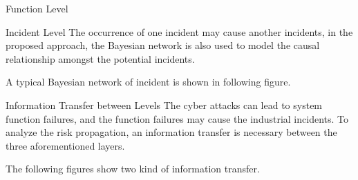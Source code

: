 \begin{frame}{Function Level}
    \label<trans:1>{Hazardous Incident Prediction: Comparison of Fault Tree and Bayesian Network Question}
    \label<trans:2>{Hazardous Incident Prediction: Comparison of Fault Tree and Bayesian Network Answer}
    \begin{overlayarea}{\textwidth}{6cm}
    \begin{center}
      
    \end{center}
    \end{overlayarea}
\end{frame}

\begin{frame}{Incident Level}\label{Hazardous Incident Prediction: Incident Level}
    The occurrence of one incident may cause another incidents, in the proposed approach, the Bayesian network is also used to model the causal relationship amongst the potential incidents.

    A typical Bayesian network of incident is shown in following figure.

    \begin{center}
      
    \end{center}
\end{frame}

\begin{frame}{Information Transfer between Levels}
    \label<trans:1>{Hazardous Incident Prediction: Information Transfer from Attack to Function}
    \label<trans:2>{Hazardous Incident Prediction: Information Transfer from Function to Incident}
    The cyber attacks can lead to system function failures, and the function failures may cause the industrial incidents. To analyze the risk propagation, an information transfer is necessary between the three aforementioned layers.

    The following figures show two kind of information transfer.

    \begin{center}
    \end{center}
\end{frame}

